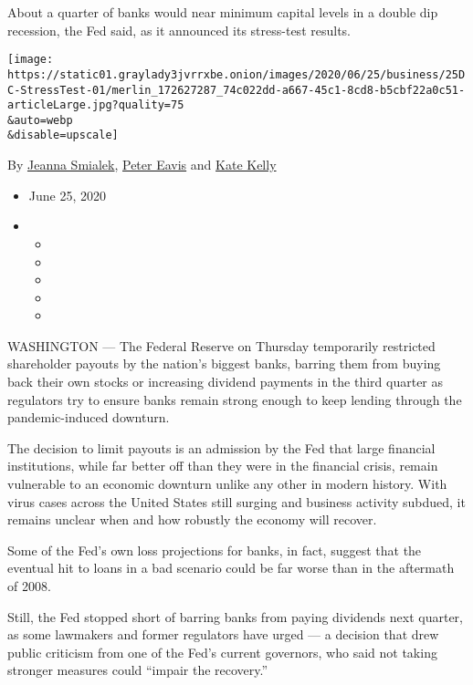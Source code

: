 About a quarter of banks would near minimum capital levels in a double
dip recession, the Fed said, as it announced its stress-test results.

\texttt{[image: https://static01.graylady3jvrrxbe.onion/images/2020/06/25/business/25DC-StressTest-01/merlin\_172627287\_74c022dd-a667-45c1-8cd8-b5cbf22a0c51-articleLarge.jpg?quality=75\\\&auto=webp\\\&disable=upscale]}

By \href{https://www.nytimes3xbfgragh.onion/by/jeanna-smialek}{Jeanna
Smialek}, \href{https://www.nytimes3xbfgragh.onion/by/peter-eavis}{Peter
Eavis} and \href{https://www.nytimes3xbfgragh.onion/by/kate-kelly}{Kate
Kelly}

\begin{itemize}
\item
  June 25, 2020
\item
  \begin{itemize}
  \item
  \item
  \item
  \item
  \item
  \end{itemize}
\end{itemize}

WASHINGTON --- The Federal Reserve on Thursday temporarily restricted
shareholder payouts by the nation's biggest banks, barring them from
buying back their own stocks or increasing dividend payments in the
third quarter as regulators try to ensure banks remain strong enough to
keep lending through the pandemic-induced downturn.

The decision to limit payouts is an admission by the Fed that large
financial institutions, while far better off than they were in the
financial crisis, remain vulnerable to an economic downturn unlike any
other in modern history. With virus cases across the United States still
surging and business activity subdued, it remains unclear when and how
robustly the economy will recover.

Some of the Fed's own loss projections for banks, in fact, suggest that
the eventual hit to loans in a bad scenario could be far worse than in
the aftermath of 2008.

Still, the Fed stopped short of barring banks from paying dividends next
quarter, as some lawmakers and former regulators have urged --- a
decision that drew public criticism from one of the Fed's current
governors, who said not taking stronger measures could ``impair the
recovery.''

